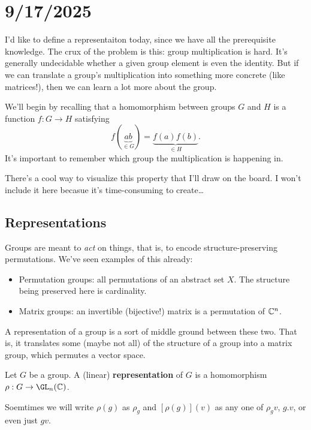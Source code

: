\section{9/17/2025}
I'd like to define a representaiton today, since we have all the prerequisite knowledge.
The crux of the problem is this: group multiplication is hard.
It's generally undecidable whether a given group element is even the identity.
But if we can translate a group's multiplication into something more concrete (like matrices!),
then we can learn a lot more about the group.

We'll begin by recalling that a homomorphism between groups $G$ and $H$ 
is a function $f:G\to H$ satisfying \[ f(\underbrace{ab}_{\in G}) = \underbrace{f(a)f(b)}_{\in H}. \]
It's important to remember which group the multiplication is happening in.

There's a cool way to visualize this property that I'll draw on the board.
I won't include it here becasue it's time-consuming to create\dots

\subsection{Representations}
Groups are meant to {\it act} on things, that is, to encode structure-preserving permutations.
We've seen examples of this already:
\begin{itemize}
    \item Permutation groups: all permutations of an abstract set $X$. The structure being preserved here is cardinality.
    \item Matrix groups: an invertible (bijective!) matrix is a permutation of $\mathbb{C}^n$.
\end{itemize}

A representation of a group is a sort of middle ground between these two.
That is, it translates some (maybe not all) of the structure of a group into a matrix group, which permutes a vector space.

\begin{definition}
    Let $G$ be a group.
    A (linear) {\bf representation} of $G$ is a homomorphism $\rho:G \to \GL_n(\C)$.
\end{definition}

\begin{remark}
    Soemtimes we will write $\rho(g)$ as $\rho_g$ and $[\rho(g)](v)$ as any one of $\rho_g v$, $g.v$, or even just $gv$.
\end{remark}

